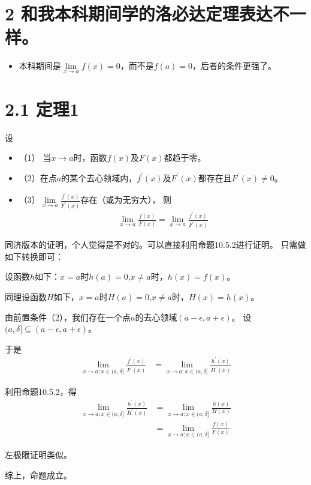 \documentclass{article}
\begin{document}
\section*{2 \textbf{和我本科期间学的洛必达定理表达不一样。}}

\begin{itemize}
  \item 本科期间是$\lim\limits_{x \to a} f(x) = 0$，而不是$f(a) = 0$，后者的条件更强了。
\end{itemize}


\section*{2.1 定理1}

\begin{zremark}
  设
  \begin{itemize}
    \item （1） 当$x \to a$时，函数$f(x)$及$F(x)$都趋于零。
    \item （2）在点$a$的某个去心领域内，$f^\prime(x)$及$F^\prime(x)$都存在且$F^\prime(x) \not = 0$。
    \item （3）$\lim\limits_{x \to a} \frac{f^\prime(x)}{F^\prime(x)}$存在（或为无穷大），
          则
          \begin{align*}
            \lim\limits_{x \to a} \frac{f(x)}{F(x)} = \lim\limits_{x \to a} \frac{f^\prime(x)}{F^\prime(x)}
          \end{align*}
  \end{itemize}
\end{zremark}

同济版本的证明，个人觉得是不对的。可以直接利用命题10.5.2进行证明。
只需做如下转换即可：

设函数$h$如下：$x = a$时$h(a) = 0$,$x \not = a$时，$h(x) = f(x)$。

同理设函数$H$如下，$x = a$时$H(a) = 0$,$x \not = a$时，$H(x) = h(x)$。

由前置条件（2），我们存在一个点$a$的去心领域$(a - \epsilon, a + \epsilon)$。
设$(a, \delta] \subseteq (a - \epsilon, a + \epsilon)$。

于是
\begin{align*}
  \lim\limits_{x \to a; x \in (a, \delta]} \frac{f^\prime(x)}{F^\prime(x)}
   & = \lim\limits_{x \to a; x \in (a, \delta]} \frac{h^\prime(x)}{H^\prime(x)}
\end{align*}

利用命题10.5.2，得
\begin{align*}
  \lim\limits_{x \to a; x \in (a, \delta]} \frac{h^\prime(x)}{H^\prime(x)}
   & = \lim\limits_{x \to a; x \in (a, \delta]} \frac{h(x)}{H(x)} \\
   & = \lim\limits_{x \to a; x \in (a, \delta]} \frac{f(x)}{F(x)}
\end{align*}

左极限证明类似。

综上，命题成立。
\end{document}

